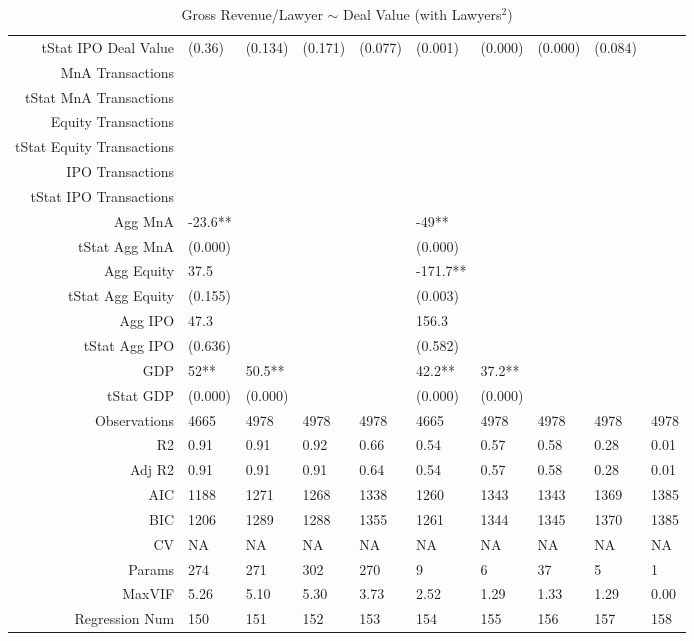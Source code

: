 \begin{table}[ht]
\begin{tabular}{rlllllllll}
  tStat IPO Deal Value & (0.36) & (0.134) & (0.171) & (0.077) & (0.001) & (0.000) & (0.000) & (0.084) &  \\ 
  MnA Transactions &  &  &  &  &  &  &  &  &  \\ 
  tStat MnA Transactions &  &  &  &  &  &  &  &  &  \\ 
  Equity Transactions &  &  &  &  &  &  &  &  &  \\ 
  tStat Equity Transactions &  &  &  &  &  &  &  &  &  \\ 
  IPO Transactions &  &  &  &  &  &  &  &  &  \\ 
  tStat IPO Transactions &  &  &  &  &  &  &  &  &  \\ 
  Agg MnA & -23.6** &  &  &  & -49** &  &  &  &  \\ 
  tStat Agg MnA & (0.000) &  &  &  & (0.000) &  &  &  &  \\ 
  Agg Equity & 37.5 &  &  &  & -171.7** &  &  &  &  \\ 
  tStat Agg Equity & (0.155) &  &  &  & (0.003) &  &  &  &  \\ 
  Agg IPO & 47.3 &  &  &  & 156.3 &  &  &  &  \\ 
  tStat Agg IPO & (0.636) &  &  &  & (0.582) &  &  &  &  \\ 
  GDP & 52** & 50.5** &  &  & 42.2** & 37.2** &  &  &  \\ 
  tStat GDP & (0.000) & (0.000) &  &  & (0.000) & (0.000) &  &  &  \\ 
  Observations & 4665 & 4978 & 4978 & 4978 & 4665 & 4978 & 4978 & 4978 & 4978 \\ 
  R2 & 0.91 & 0.91 & 0.92 & 0.66 & 0.54 & 0.57 & 0.58 & 0.28 & 0.01 \\ 
  Adj R2 & 0.91 & 0.91 & 0.91 & 0.64 & 0.54 & 0.57 & 0.58 & 0.28 & 0.01 \\ 
  AIC & 1188 & 1271 & 1268 & 1338 & 1260 & 1343 & 1343 & 1369 & 1385 \\ 
  BIC & 1206 & 1289 & 1288 & 1355 & 1261 & 1344 & 1345 & 1370 & 1385 \\ 
  CV & NA & NA & NA & NA & NA & NA & NA & NA & NA \\ 
  Params & 274 & 271 & 302 & 270 & 9 & 6 & 37 & 5 & 1 \\ 
  MaxVIF & 5.26 & 5.10 & 5.30 & 3.73 & 2.52 & 1.29 & 1.33 & 1.29 & 0.00 \\ 
  Regression Num & 150 & 151 & 152 & 153 & 154 & 155 & 156 & 157 & 158 \\ 
   \hline
\end{tabular}
\caption{Gross Revenue/Lawyer $\sim$ Deal Value (with Lawyers$^2$)} 
\end{table}
